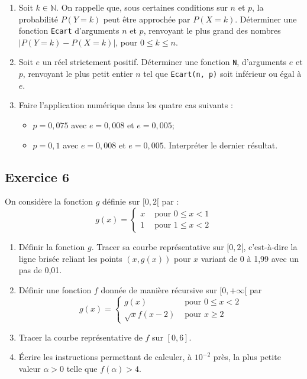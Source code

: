 \documentclass[10pt,fleqn]{article} %
\begin{document}
\begin{multicols}{2}
\begin{enumerate}
Déterminer, pour $n = 30$ et $p = 0,1$, la liste des valeurs de $P(Y = k)$ pour $k \in \mathbb{N}$, $0 \leq k \leq 30$.
\item Soit $k \in \mathbb{N}$. On rappelle que, sous certaines conditions sur $n$ et $p$, la probabilité $P(Y = k)$ peut être
approchée par $P(X = k)$. Déterminer une fonction \texttt{Ecart} d’arguments $n$ et $p$, renvoyant le plus grand
des nombres $|P(Y = k) - P(X = k)|$, pour $0 \leq k \leq n$.
\item Soit $e$ un réel strictement positif. Déterminer une fonction \texttt{N}, d’arguments $e$ et $p$, renvoyant le plus
petit entier $n$ tel que \texttt{Ecart(n, p)} soit inférieur ou égal à $e$.
\item Faire l’application numérique dans les quatre cas suivants :
\begin{itemize}
\item $p = 0,075$ avec $e = 0,008$ et $e = 0,005$;
\item $p = 0,1$ avec $e = 0,008$ et $e = 0,005$. Interpréter le dernier résultat.
\end{itemize}
\end{enumerate}



\subsection*{Exercice 6}
On considère la fonction $g$ définie sur $[0 , 2[$ par :
$$ g(x) =
\left\{
\begin{array}{ll}
x &\text{ pour } 0\leq x < 1 \\
1 &\text{ pour } 1\leq x < 2 
\end{array}
\right.
$$
\begin{enumerate}
\item Définir la fonction $g$. Tracer sa courbe représentative sur $[0 , 2[$, c’est-à-dire la ligne brisée reliant les points $(x, g(x))$ pour $x$ variant de 0 à 1,99 avec un pas de 0,01.
\item Définir une fonction $f$ donnée de manière récursive sur $[0 , +\infty[$ par
$$ g(x) =
\left\{
\begin{array}{ll}
g(x) &\text{ pour } 0\leq x < 2 \\
\sqrt{x} f(x-2) &\text{ pour } x \geq 2
\end{array}
\right.
$$
\item Tracer la courbe représentative de $f$ sur $[0,6]$.
\item Écrire les instructions permettant de calculer, à $10^{-2}$ près, la plus petite valeur $\alpha > 0$ telle que $f(\alpha) > 4$.
\end{enumerate}


\end{multicols}
\end{document}

